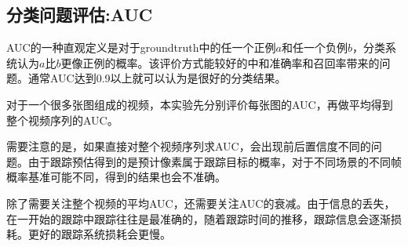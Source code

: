 \subsection{分类问题评估:AUC} \label{section:auc}
AUC的一种直观定义是对于groundtruth中的任一个正例$a$和任一个负例$b$，分类系统认为$a$比$b$更像正例的概率。该评价方式能较好的中和准确率和召回率带来的问题。通常AUC达到0.9以上就可以认为是很好的分类结果。
\par
对于一个很多张图组成的视频，本实验先分别评价每张图的AUC，再做平均得到整个视频序列的AUC。
\par
需要注意的是，如果直接对整个视频序列求AUC，会出现前后置信度不同的问题。由于跟踪预估得到的是预计像素属于跟踪目标的概率，对于不同场景的不同帧概率基准可能不同，得到的结果也会不准确。
\par
除了需要关注整个视频的平均AUC，还需要关注AUC的衰减。由于信息的丢失，在一开始的跟踪中跟踪往往是最准确的，随着跟踪时间的推移，跟踪信息会逐渐损耗。更好的跟踪系统损耗会更慢。


